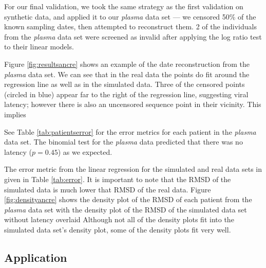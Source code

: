 \documentclass[12pt]{article}
\begin{document}
For our final validation, we took the same strategy as the first validation on synthetic data, and applied it to our {\em plasma} data set --- we censored 50\% of the known sampling dates, then attempted to reconstruct them.
2 of the individuals from the {\em plasma} data set were screened as invalid after applying the log ratio test to their linear models.

Figure \ref{fig:resultsancre} shows an example of the date reconstruction from the \emph{plasma} data set.
We can see that in the real data the points do fit around the regression line as well as in the simulated data.
Three of the censored points (circled in blue) appear far to the right of the regression line, suggesting viral latency; however there is also an uncensored sequence point in their vicinity.
This implies

See Table \ref{tab:patientserror} for the error metrics for each patient in the \emph{plasma} data set.
The binomial test for the \emph{plasma} data predicted that there was no latency ($p=0.45$) as we expected.

The error metric from the linear regression for the simulated and real data sets in given in Table \ref{tab:error}.
It is important to note that the RMSD of the simulated data is much lower that RMSD of the real data.
Figure \ref{fig:densityancre} shows the density plot of the RMSD of each patient from the \emph{plasma} data set with the density plot of the RMSD of the simulated data set without latency overlaid
Although not all of the density plots fit into the simulated data set's density plot, some of the density plots fit very well.

\subsection * {Application} \label{sec:mixed_data}

\end{document}

